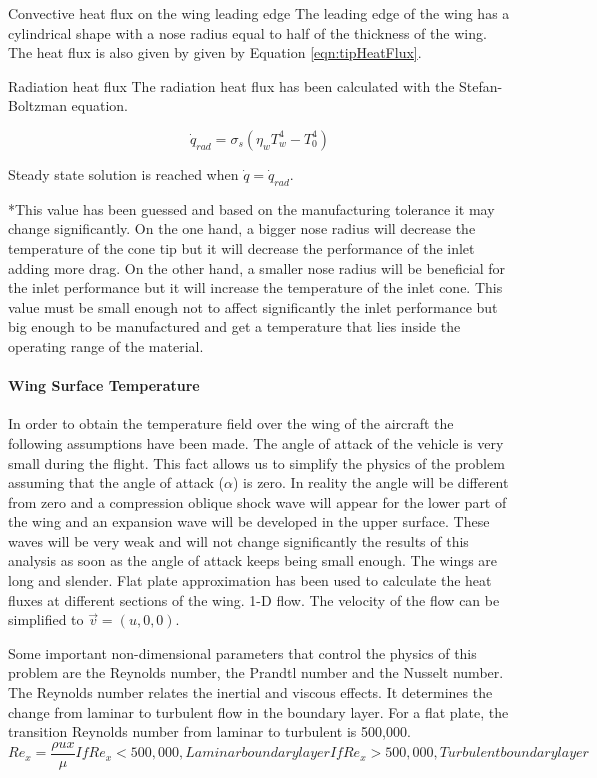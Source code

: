 Convective heat flux on the wing leading edge
The leading edge of the wing has a cylindrical shape with a nose radius equal to half of the thickness of the wing. The heat flux is also given by given by Equation \ref{eqn:tipHeatFlux}.

Radiation heat flux
The radiation heat flux has been calculated with the Stefan-Boltzman equation.

\begin{equation}
\dot{q}_{rad}=\sigma_s (\eta_w T_w^4-T_0^4)
\end{equation}

Steady state solution is reached when $\dot{q}=\dot{q}_{rad}$.


*This value has been guessed and based on the manufacturing tolerance it may change significantly. On the one hand, a bigger nose radius will decrease the temperature of the cone tip but it will decrease the performance of the inlet adding more drag. On the other hand, a smaller nose radius will be beneficial for the inlet performance but it will increase the temperature of the inlet cone. This value must be small enough not to affect significantly the inlet performance but big enough to be manufactured and get a temperature that lies inside the operating range of the material.

\paragraph{Wing Surface Temperature}
In order to obtain the temperature field over the wing of the aircraft the following assumptions have been made.
	The angle of attack of the vehicle is very small during the flight. This fact allows us to simplify the physics of the problem assuming that the angle of attack ($\alpha$) is zero. In reality the angle will be different from zero and a compression oblique shock wave will appear for the lower part of the wing and an expansion wave will be developed in the upper surface. These waves will be very weak and will not change significantly the results of this analysis as soon as the angle of attack keeps being small enough.
	The wings are long and slender. Flat plate approximation has been used to calculate the heat fluxes at different sections of the wing.
	1-D flow. The velocity of the flow can be simplified to $\overrightarrow{v}=(u,0,0)$.
	
Some important non-dimensional parameters that control the physics of this problem are the Reynolds number, the Prandtl number and the Nusselt number.
The Reynolds number relates the inertial and viscous effects. It determines the change from laminar to turbulent flow in the boundary layer. For a flat plate, the transition Reynolds number from laminar to turbulent is 500,000.
\begin{equation}
Re_x=\frac{\rho u x}{\mu}	
If   Re_x<500,000, Laminar boundary layer
	If   Re_x>500,000, Turbulent boundary layer
\end{equation}


